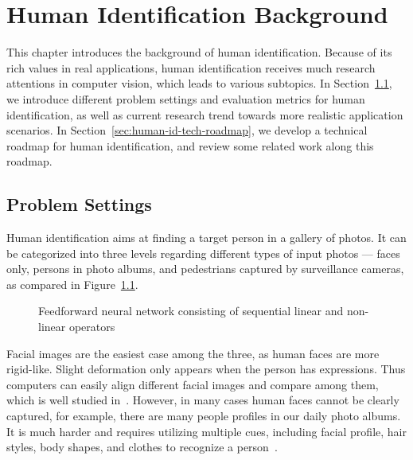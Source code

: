 \chapter{Human Identification Background}
\label{ch:human-identification-background}



This chapter introduces the background of human identification. Because of its rich values in real applications, human identification receives much research attentions in computer vision, which leads to various subtopics. In Section~\ref{sec:human-id-prob-settings}, we introduce different problem settings and evaluation metrics for human identification, as well as current research trend towards more realistic application scenarios. In Section~\ref{sec:human-id-tech-roadmap}, we develop a technical roadmap for human identification, and review some related work along this roadmap.

\section{Problem Settings} %
\label{sec:human-id-prob-settings}
Human identification aims at finding a target person in a gallery of photos. It can be categorized into three levels regarding different types of input photos --- faces only, persons in photo albums, and pedestrians captured by surveillance cameras, as compared in Figure~\ref{fig:human-id-problems}.
\begin{figure}[t]
\begin{center}
\fbox{\rule{0pt}{2in} \rule{0.9\linewidth}{0pt}}
\caption{Feedforward neural network consisting of sequential linear and non-linear operators}
\label{fig:human-id-problems}
\end{center}
\end{figure}

Facial images are the easiest case among the three, as human faces are more rigid-like. Slight deformation only appears when the person has expressions. Thus computers can easily align different facial images and compare among them, which is well studied in~\cite{sun2014deep1,sun2014deep2,taigman2014deepface,parkhi2015deep}. However, in many cases human faces cannot be clearly captured, for example, there are many people profiles in our daily photo albums. It is much harder and requires utilizing multiple cues, including facial profile, hair styles, body shapes, and clothes to recognize a person~\cite{zhang2015beyond}.


